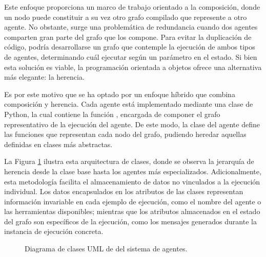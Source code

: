 Este enfoque proporciona un marco de trabajo orientado a la composición, donde un nodo puede constituir a su vez otro grafo compilado que represente a otro agente. No obstante, surge una problemática de redundancia cuando dos agentes comparten gran parte del grafo que los compone. Para evitar la duplicación de código, podría desarrollarse un grafo que contemple la ejecución de ambos tipos de agentes, determinando cuál ejecutar según un parámetro en el estado. Si bien esta solución es viable, la programación orientada a objetos ofrece una alternativa más elegante: la herencia.

Es por este motivo que se ha optado por un enfoque híbrido que combina composición y herencia. Cada agente está implementado mediante una clase de Python, la cual contiene la función , encargada de componer el grafo representativo de la ejecución del agente. De este modo, la clase del agente define las funciones que representan cada nodo del grafo, pudiendo heredar aquellas definidas en clases más abstractas.

La Figura \ref{fig:uml} ilustra esta arquitectura de clases, donde se observa la jerarquía de herencia desde la clase base  hasta los agentes más especializados. Adicionalmente, esta metodología facilita el almacenamiento de datos no vinculados a la ejecución individual. Los datos encapsulados en los atributos de las clases representan información invariable en cada ejemplo de ejecución, como el nombre del agente o las herramientas disponibles; mientras que los atributos almacenados en el estado del grafo son específicos de la ejecución, como los mensajes generados durante la instancia de ejecución concreta.

\begin{figure}[p]
  \centering
  \caption{Diagrama de clases UML de del sistema de agentes.}
  \label{fig:uml}
\end{figure}

